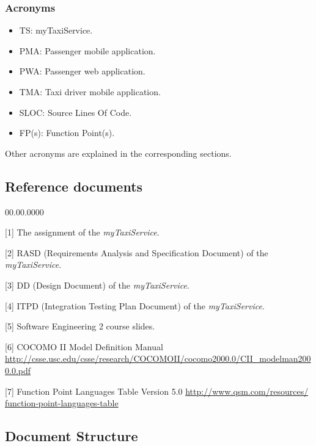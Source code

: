\subsubsection{Acronyms}
\begin{itemize}
\item TS: myTaxiService.
\item PMA: Passenger mobile application.
\item PWA: Passenger web application.
\item TMA: Taxi driver mobile application.
\item SLOC: Source Lines Of Code.
\item FP(s): Function Point(s).
\end{itemize}
Other acronyms are explained in the corresponding sections.


\subsection{Reference documents}
\begin{lyxlist}{00.00.0000}
\item [{{[}1{]}}] The assignment of the \emph{myTaxiService}.
\item [{{[}2{]}}] RASD (Requirements Analysis and Specification Document)
of the \emph{myTaxiService}.
\item [{{[}3{]}}] DD (Design Document) of the \emph{myTaxiService}.
\item [{{[}4{]}}] ITPD (Integration Testing Plan Document) of the \emph{myTaxiService}.
\item [{{[}5{]}}] Software Engineering 2 course slides.
\item [{{[}6{]}}] COCOMO II Model Definition Manual \url{http://csse.usc.edu/csse/research/COCOMOII/cocomo2000.0/CII_modelman2000.0.pdf}
\item [{{[}7{]}}] Function Point Languages Table Version 5.0 \url{http://www.qsm.com/resources/ function-point-languages-table}
\end{lyxlist}

\subsection{Document Structure}

